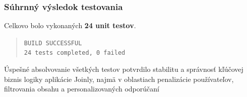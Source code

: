   \subsubsection{Súhrnný výsledok testovania}
  Celkovo bolo vykonaných \textbf{24 unit testov}.

  \begin{quote}
      \texttt{BUILD SUCCESSFUL} \\                                                                                                                                                                                                 
      \texttt{24 tests completed, 0 failed}
  \end{quote}

  Úspešné absolvovanie všetkých testov potvrdilo stabilitu a správnosť
  kľúčovej biznis logiky aplikácie Joinly, najmä v oblastiach penalizácie
  používateľov, filtrovania obsahu a personalizovaných odporúčaní